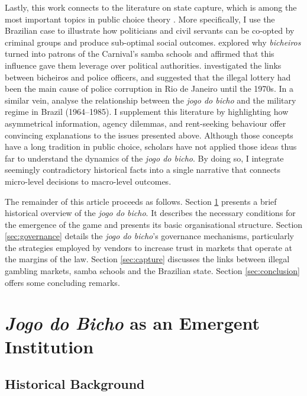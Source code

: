 Lastly, this work connects to the literature on state capture, which is among the most important topics in public choice theory \citep{hellman2003seize, rose1978corruption, rose1999corruption, shleifer2002grabbing, tollison1982rent}. More specifically, I use the Brazilian case to illustrate how politicians and civil servants can be co-opted by criminal groups and produce sub-optimal social outcomes. \citet{queiroz1992carnaval} explored why \emph{bicheiros} turned into patrons of the Carnival's samba schools and affirmed that this influence gave them leverage over political authorities. \citet{misse2007illegal} investigated the links between bicheiros and police officers, and suggested that the illegal lottery had been the main cause of police corruption in Rio de Janeiro until the 1970s. In a similar vein, \citet{jupiara2015poroes} analyse the relationship between the \emph{jogo do bicho} and the military regime in Brazil (1964--1985). I supplement this literature by highlighting how asymmetrical information, agency dilemmas, and rent-seeking behaviour offer convincing explanations to the issues presented above. Although those concepts have a long tradition in public choice, scholars have not applied those ideas thus far to understand the dynamics of the \emph{jogo do bicho}. By doing so, I integrate seemingly contradictory historical facts into a single narrative that connects micro-level decisions to macro-level outcomes.

The remainder of this article proceeds as follows. Section \ref{sec:organisation} presents a brief historical overview of the \emph{jogo do bicho}. It describes the necessary conditions for the emergence of the game and presents its basic organisational structure. Section \ref{sec:governance} details the \emph{jogo do bicho}'s governance mechanisms, particularly the strategies employed by vendors to increase trust in markets that operate at the margins of the law. Section \ref{sec:capture} discusses the links between illegal gambling markets, samba schools and the Brazilian state. Section \ref{sec:conclusion} offers some concluding remarks.

\section{\emph{Jogo do Bicho} as an Emergent Institution}
\label{sec:organisation}

\subsection{Historical Background}
\label{sub:background}

